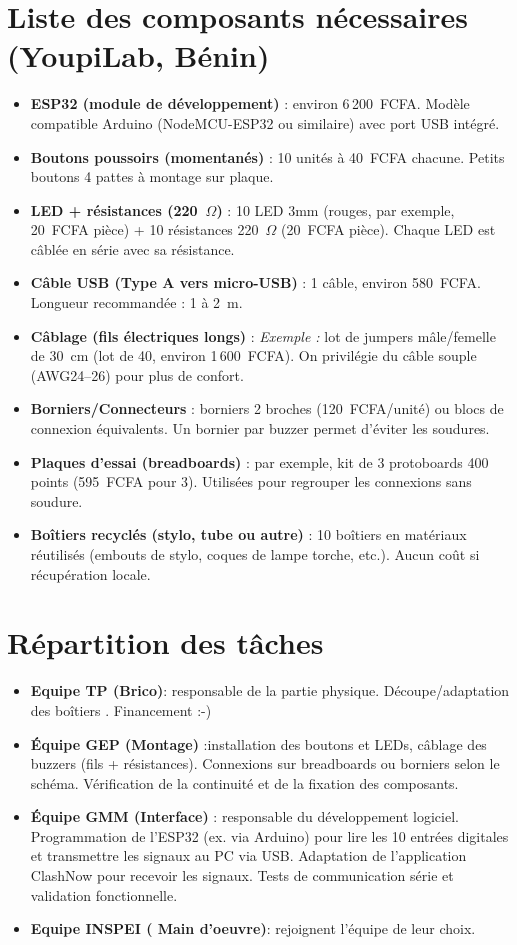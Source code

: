 \documentclass[a4paper,11pt]{article}
\begin{document}
\section{Liste des composants nécessaires (YoupiLab, Bénin)}
\begin{itemize}
  \item \textbf{ESP32 (module de développement)} : environ 6\,200~FCFA. Modèle compatible Arduino (NodeMCU-ESP32 ou similaire) avec port USB intégré.
  \item \textbf{Boutons poussoirs (momentanés)} : 10 unités à 40~FCFA chacune. Petits boutons 4 pattes à montage sur plaque.
  \item \textbf{LED + résistances (220~$\Omega$)} : 10 LED 3mm (rouges, par exemple, 20~FCFA pièce) + 10 résistances 220~$\Omega$ (20~FCFA pièce). Chaque LED est câblée en série avec sa résistance.
  \item \textbf{Câble USB (Type A vers micro-USB)} : 1 câble, environ 580~FCFA. Longueur recommandée : 1 à 2~m.
  \item \textbf{Câblage (fils électriques longs)} : \textit{Exemple :} lot de jumpers mâle/femelle de 30~cm (lot de 40, environ 1\,600~FCFA). On privilégie du câble souple (AWG24–26) pour plus de confort.
  \item \textbf{Borniers/Connecteurs} : borniers 2 broches (120~FCFA/unité) ou blocs de connexion équivalents. Un bornier par buzzer permet d’éviter les soudures.
  \item \textbf{Plaques d’essai (breadboards)} : par exemple, kit de 3 protoboards 400 points (595~FCFA pour 3). Utilisées pour regrouper les connexions sans soudure.
  \item \textbf{Boîtiers recyclés (stylo, tube ou autre)} : 10 boîtiers en matériaux réutilisés (embouts de stylo, coques de lampe torche, etc.). Aucun coût si récupération locale.
\end{itemize}

\section{Répartition des tâches}
\begin{itemize}
\item \textbf{Equipe TP (Brico)}: responsable de la partie physique. Découpe/adaptation des boîtiers . Financement :-)
  \item \textbf{Équipe GEP (Montage)} :installation des boutons et LEDs, câblage des buzzers (fils + résistances). Connexions sur breadboards ou borniers selon le schéma. Vérification de la continuité et de la fixation des composants.
  \item \textbf{Équipe GMM (Interface)} : responsable du développement logiciel. Programmation de l’ESP32 (ex. via Arduino) pour lire les 10 entrées digitales et transmettre les signaux au PC via USB. Adaptation de l’application ClashNow pour recevoir les signaux. Tests de communication série et validation fonctionnelle.
\item \textbf{Equipe INSPEI ( Main d'oeuvre)}: rejoignent l'équipe de leur choix.
\end{itemize}
\end{document}
